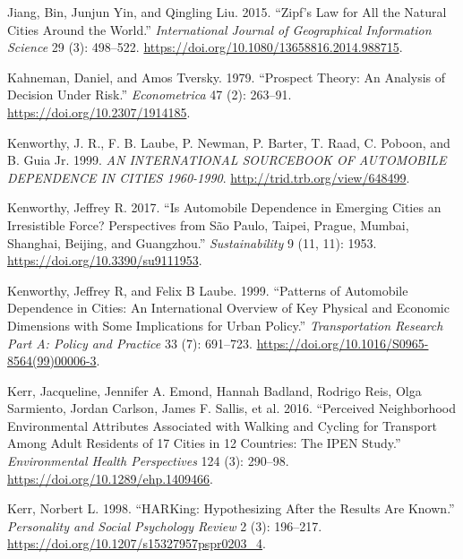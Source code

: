 \documentclass[
  11pt,
  openany]{memoir}
\newlength{\cslhangindent}
\newlength{\cslentryspacingunit} %
\newenvironment{CSLReferences}[2] %
 {%
  \setlength{\parindent}{0pt}
  \ifodd #1
  \let\oldpar\par
  \def\par{\hangindent=\cslhangindent\oldpar}
  \fi
  \setlength{\parskip}{#2\cslentryspacingunit}
 }%
 {}
\begin{document}
\begin{CSLReferences}{1}{0}
\leavevmode{}%
Jiang, Bin, Junjun Yin, and Qingling Liu. 2015. {``Zipf's Law for All the Natural Cities Around the World.''} \emph{International Journal of Geographical Information Science} 29 (3): 498--522. \url{https://doi.org/10.1080/13658816.2014.988715}.

\leavevmode{}%
Kahneman, Daniel, and Amos Tversky. 1979. {``Prospect {Theory}: An {Analysis} of {Decision} Under {Risk}.''} \emph{Econometrica} 47 (2): 263--91. \url{https://doi.org/10.2307/1914185}.

\leavevmode{}%
Kenworthy, J. R., F. B. Laube, P. Newman, P. Barter, T. Raad, C. Poboon, and B. Guia Jr. 1999. \emph{{AN INTERNATIONAL SOURCEBOOK OF AUTOMOBILE DEPENDENCE IN CITIES} 1960-1990}. \url{http://trid.trb.org/view/648499}.

\leavevmode{}%
Kenworthy, Jeffrey R. 2017. {``Is {Automobile Dependence} in {Emerging Cities} an {Irresistible Force}? Perspectives from {São Paulo}, {Taipei}, {Prague}, {Mumbai}, {Shanghai}, {Beijing}, and {Guangzhou}.''} \emph{Sustainability} 9 (11, 11): 1953. \url{https://doi.org/10.3390/su9111953}.

\leavevmode{}%
Kenworthy, Jeffrey R, and Felix B Laube. 1999. {``Patterns of Automobile Dependence in Cities: An International Overview of Key Physical and Economic Dimensions with Some Implications for Urban Policy.''} \emph{Transportation Research Part A: Policy and Practice} 33 (7): 691--723. \url{https://doi.org/10.1016/S0965-8564(99)00006-3}.

\leavevmode{}%
Kerr, Jacqueline, Jennifer A. Emond, Hannah Badland, Rodrigo Reis, Olga Sarmiento, Jordan Carlson, James F. Sallis, et al. 2016. {``Perceived {Neighborhood Environmental Attributes Associated} with {Walking} and {Cycling} for {Transport} Among {Adult Residents} of 17 {Cities} in 12 {Countries}: The {IPEN Study}.''} \emph{Environmental Health Perspectives} 124 (3): 290--98. \url{https://doi.org/10.1289/ehp.1409466}.

\leavevmode{}%
Kerr, Norbert L. 1998. {``{HARKing}: Hypothesizing {After} the {Results} Are {Known}.''} \emph{Personality and Social Psychology Review} 2 (3): 196--217. \url{https://doi.org/10.1207/s15327957pspr0203_4}.


\end{CSLReferences}
\end{document}
